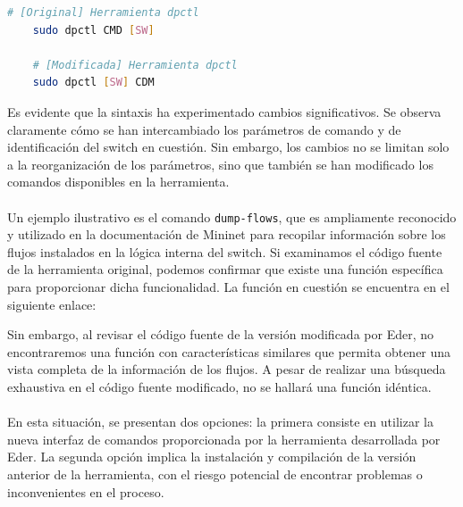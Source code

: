 \begin{lstlisting}[language= bash, style=Consola, caption={Diferencias en las herramientas dpctl},label=code:dpctlDiff]
    # [Original] Herramienta dpctl 
    sudo dpctl CMD [SW]

    # [Modificada] Herramienta dpctl 
    sudo dpctl [SW] CDM 
\end{lstlisting}
\vspace{0.5cm}

Es evidente que la sintaxis ha experimentado cambios significativos. Se observa claramente cómo se han intercambiado los parámetros de comando y de identificación del switch en cuestión. Sin embargo, los cambios no se limitan solo a la reorganización de los parámetros, sino que también se han modificado los comandos disponibles en la herramienta.\\
\\
Un ejemplo ilustrativo es el comando \texttt{dump-flows}, que es ampliamente reconocido y utilizado en la documentación de Mininet para recopilar información sobre los flujos instalados en la lógica interna del switch. Si examinamos el código fuente de la herramienta original, podemos confirmar que existe una función específica para proporcionar dicha funcionalidad. La función en cuestión se encuentra en el siguiente enlace:


Sin embargo, al revisar el código fuente de la versión modificada por Eder, no encontraremos una función con características similares que permita obtener una vista completa de la información de los flujos. A pesar de realizar una búsqueda exhaustiva en el código fuente modificado, no se hallará una función idéntica.\\
\\
En esta situación, se presentan dos opciones: la primera consiste en utilizar la nueva interfaz de comandos proporcionada por la herramienta desarrollada por Eder. La segunda opción implica la instalación y compilación de la versión anterior de la herramienta, con el riesgo potencial de encontrar problemas o inconvenientes en el proceso.

